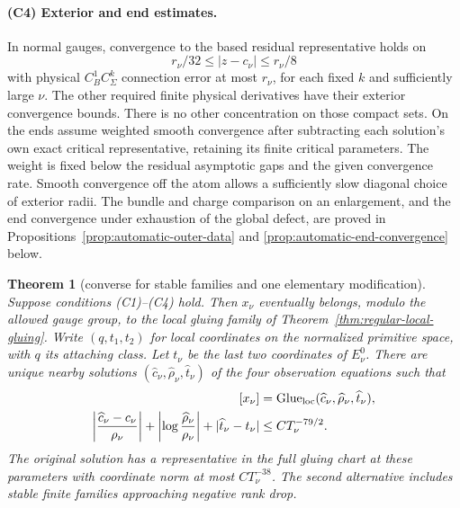 \documentclass[11pt]{amsart}
\newtheorem{theorem}{Theorem}[section]
\theoremstyle{definition}
\theoremstyle{remark}
\theoremstyle{plain}
\newcommand{\Glue}{\operatorname{Glue}}
\begin{document}
\paragraph{(C4) Exterior and end estimates.}
In normal gauges, convergence to the based residual representative
holds on
\[
 r_\nu/32\leq |z-c_\nu|\leq r_\nu/8
\]
with physical $C^1_BC^k_\Sigma$ connection error at most $r_\nu$,
for each fixed $k$ and sufficiently large $\nu$. The other required
finite physical derivatives have their exterior convergence bounds.
There is no other concentration on those compact sets. On the ends
assume weighted smooth convergence after subtracting each solution's
own exact critical representative, retaining its finite critical
parameters. The weight is fixed below the residual asymptotic gaps
and the given convergence rate. Smooth convergence off the atom
allows a sufficiently slow diagonal choice of exterior radii.
The bundle and charge comparison on an enlargement, and the end
convergence under exhaustion of the global defect, are proved in
Propositions~\ref{prop:automatic-outer-data} and
\ref{prop:automatic-end-convergence} below.

\begin{theorem}[converse for stable families and one elementary modification]
\label{thm:regular-sector-converse}
Suppose conditions \textup{(C1)--(C4)} hold.
Then $x_\nu$ eventually belongs, modulo the allowed
gauge group, to the local gluing family of
Theorem~\ref{thm:regular-local-gluing}.
Write $(q,t_1,t_2)$ for local coordinates on the normalized
primitive space, with $q$ its attaching class. Let $t_\nu$ be the
last two coordinates of $E_\nu^0$. There are unique nearby solutions
$(\widehat c_\nu,\widehat\rho_\nu,\widehat t_\nu)$ of the four
observation equations such that
\begin{equation}\label{eq:converse-parameter-bound}
\begin{split}
 [x_\nu]&=\Glue_{\rm loc}(\widehat c_\nu,\widehat\rho_\nu,
                                      \widehat t_\nu),\\
 \left|\frac{\widehat c_\nu-c_\nu}{\rho_\nu}\right|
 +\left|\log\frac{\widehat\rho_\nu}{\rho_\nu}\right|
 +|\widehat t_\nu-t_\nu|&\leq CT_\nu^{-79/2}.
\end{split}
\end{equation}
The original solution has a representative in the full gluing chart
at these parameters with coordinate norm at most $CT_\nu^{-38}$.
The second alternative includes stable finite families approaching
negative rank drop.
\end{theorem}
\end{document}
